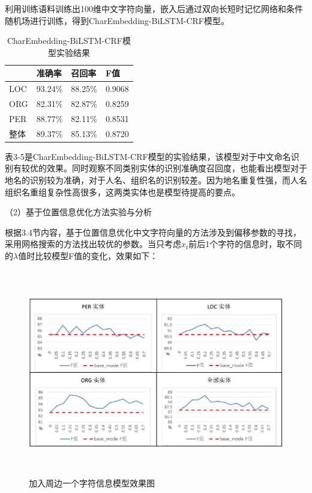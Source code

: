 \documentclass[winfonts,master,oneside,nobackinfo]{njuthesis}
\begin{document}
利用训练语料训练出100维中文字符向量，嵌入后通过双向长短时记忆网络和条件随机场进行训练，得到CharEmbedding-BiLSTM-CRF模型。

\begin{table}[H]
\centering
\begin{tabular}{|l|l|l|l|}
\hline
    & 准确率     & 召回率     & F值    \\ \hline
LOC & 93.24\% & 88.25\% & 0.9068 \\ \hline
ORG & 82.31\% & 82.87\% & 0.8259 \\ \hline
PER & 88.77\% & 82.11\% & 0.8531 \\ \hline
整体  & 89.37\% & 85.13\% & 0.8720 \\ \hline
\end{tabular}
\caption{CharEmbedding-BiLSTM-CRF模型实验结果}
\end{table}

表3-5是CharEmbedding-BiLSTM-CRF模型的实验结果，该模型对于中文命名识别有较优的效果。同时观察不同类别实体的识别准确度召回度，也能看出模型对于地名的识别较为准确，对于人名、组织名的识别较差。因为地名重复性强，而人名组织名重组复杂性高很多，这两类实体也是模型待提高的要点。



（2）基于位置信息优化方法实验与分析

根据3.4节内容，基于位置信息优化中文字符向量的方法涉及到偏移参数的寻找，采用网格搜索的方法找出较优的参数。当只考虑$x_{t}$前后1个字符的信息时，取不同的$\lambda$值时比较模型F值的变化，效果如下：

\begin{figure}[H]
\centering
\begin{minipage}[t]{\textwidth}
\includegraphics[width=1\textwidth,height=9cm]{./figure/参数1.jpg}
\caption{加入周边一个字符信息模型效果图}
\label{lab:1}
\end{minipage}
\end{figure}
\end{document}
